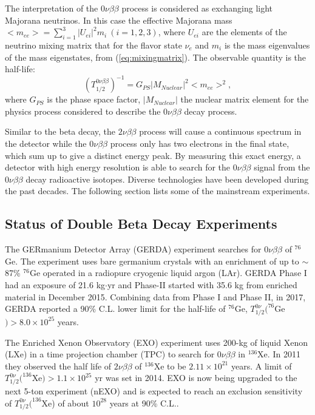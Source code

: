 \documentclass[preprint,12pt]{elsarticle}
\numberwithin{equation}{section}
\begin{document}
The interpretation of the $0\nu\beta\beta$ process is considered as exchanging light Majorana neutrinos. In this case the effective Majorana mass $<m_{ee}>=\sum_{i=1}^{3} |U_{ei}|^2m_i~(i=1,2,3)$, where $U_{ei}$ are the elements of the neutrino mixing matrix that for the flavor state $\nu_e$ and $m_i$ is the mass eigenvalues of the mass eigenstates, from (\ref{eq:mixingmatrix}). The observable quantity is the half-life:
\[
(T^{0\nu\beta\beta}_{1/2})^{-1} = G_{PS}|M_{Nuclear}|^2<m_{ee}>^2, 
\]
where $G_{PS}$ is the phase space factor, $|M_{Nuclear}|$ the nuclear matrix element for the physics process considered to describe the $0\nu\beta\beta$ decay process\cite{kaizuber}.

Similar to the beta decay, the $2\nu\beta\beta$ process will cause a continuous spectrum in the detector while the $0\nu\beta\beta$ process only has two electrons in the final state, which sum up to give a distinct energy peak. By measuring this exact energy, a detector with high energy resolution is able to search for the $0\nu\beta\beta$ signal from the $0\nu\beta\beta$ decay radioactive isotopes. Diverse technologies have been developed during the past decades. The following section lists some of the mainstream experiments.

\subsection{Status of Double Beta Decay Experiments}
The GERmanium Detector Array (GERDA) experiment searches for $0\nu\beta\beta$ of $^{76}$Ge. The experiment uses bare germanium crystals with an enrichment of up to $\sim$87\% $^{76}$Ge operated in a radiopure cryogenic liquid argon (LAr). GERDA Phase I had an exposure of 21.6 kg$\cdot$yr and Phase-II started with 35.6 kg from enriched material in December 2015. Combining data from Phase I and Phase II, in 2017, GERDA reported a 90\% C.L. lower limit for the half-life of $^{76}$Ge, $T^{0\nu}_{1/2}(^{76}$Ge$)>8.0\times 10^{25}$ years\cite{gerda,gerda2,gerda2018}.

The Enriched Xenon Observatory (EXO) experiment uses 200-kg of liquid Xenon (LXe) in a time projection chamber (TPC) to search for $0\nu\beta\beta$ in $^{136}$Xe. In 2011 they observed the half life of $2\nu\beta\beta$ of $^{136}$Xe to be $2.11\times 10^{21}$ years. A limit of $T^{0\nu}_{1/2}(^{136}$Xe$)>1.1\times 10^{25}$ yr\cite{exo} was set in 2014. EXO is now being upgraded to the next 5-ton experiment (nEXO) and is expected to reach an exclusion sensitivity of $T^{0\nu}_{1/2}(^{136}$Xe) of about $10^{28}$ years at 90\% C.L.\cite{nEXO}.
\end{document}
